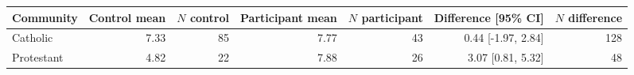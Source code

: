 
\begin{tabular}{lrrrrrr}
\toprule
Community & Control mean & $N$ control & Participant mean & $N$ participant & Difference [95\% CI] & $N$ difference\\
\midrule
Catholic & 7.33 & 85 & 7.77 & 43 & 0.44 [-1.97, 2.84] & 128\\
Protestant & 4.82 & 22 & 7.88 & 26 & 3.07 [0.81, 5.32] & 48\\
\bottomrule
\end{tabular}
